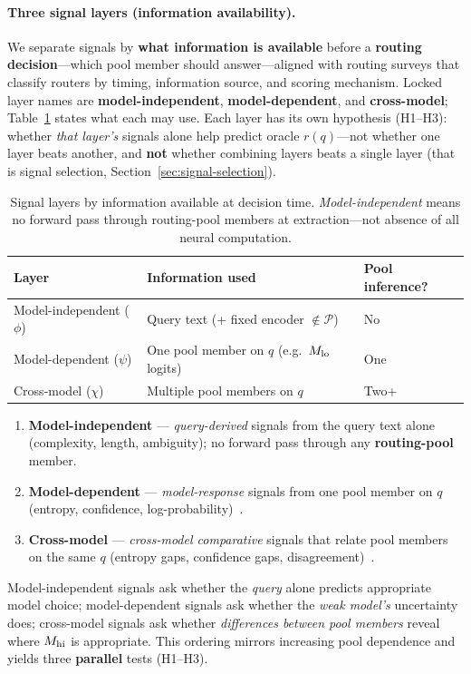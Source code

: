 \paragraph{Three signal layers (information availability).}
We separate signals by \textbf{what information is available} before a \textbf{routing decision}---which pool member should answer---aligned with routing surveys that classify routers by timing, information source, and scoring mechanism.
Locked layer names are \textbf{model-independent}, \textbf{model-dependent}, and \textbf{cross-model}; Table~\ref{tab:info-layers} states what each may use.
Each layer has its own hypothesis (H1--H3): whether \emph{that layer's} signals alone help predict oracle $r(q)$---not whether one layer beats another, and \textbf{not} whether combining layers beats a single layer (that is signal selection, Section~\ref{sec:signal-selection}).

\begin{table}[t]
  \centering
  \small
  \begin{tabular}{@{}lll@{}}
    \toprule
    \textbf{Layer} & \textbf{Information used} & \textbf{Pool inference?} \\
    \midrule
    Model-independent ($\phi$) & Query text (+ fixed encoder $\notin \mathcal{P}$) & No \\
    Model-dependent ($\psi$) & One pool member on $q$ (e.g.\ $M_{\mathrm{lo}}$ logits) & One \\
    Cross-model ($\chi$) & Multiple pool members on $q$ & Two+ \\
    \bottomrule
  \end{tabular}
  \caption{Signal layers by information available at decision time. \emph{Model-independent} means no forward pass through routing-pool members at extraction---not absence of all neural computation.}
  \label{tab:info-layers}
\end{table}

\begin{enumerate}
  \item \textbf{Model-independent} --- \emph{query-derived} signals from the query text alone (complexity, length, ambiguity); no forward pass through any \textbf{routing-pool} member.
  \item \textbf{Model-dependent} --- \emph{model-response} signals from one pool member on $q$ (entropy, confidence, log-probability)~\citep{kadavath2022know,plaut2024calibration,he2023calibration}.
  \item \textbf{Cross-model} --- \emph{cross-model comparative} signals that relate pool members on the same $q$ (entropy gaps, confidence gaps, disagreement)~\citep{kuhn2023semantic,hu2024routerbench}.
\end{enumerate}
Model-independent signals ask whether the \emph{query} alone predicts appropriate model choice; model-dependent signals ask whether the \emph{weak model's} uncertainty does; cross-model signals ask whether \emph{differences between pool members} reveal where $M_{\mathrm{hi}}$ is appropriate.
This ordering mirrors increasing pool dependence and yields three \textbf{parallel} tests (H1--H3).

